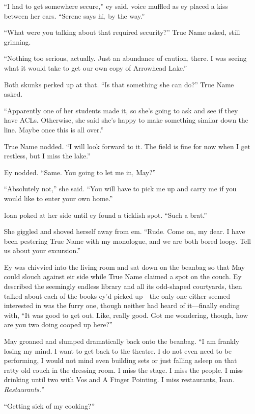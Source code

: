 ``I had to get somewhere secure,'' ey said, voice muffled as ey placed a kiss between her ears. ``Serene says hi, by the way.''

``What were you talking about that required security?'' True Name asked, still grinning.

``Nothing too serious, actually. Just an abundance of caution, there. I was seeing what it would take to get our own copy of Arrowhead Lake.''

Both skunks perked up at that. ``Is that something she can do?'' True Name asked.

``Apparently one of her students made it, so she's going to ask and see if they have ACLs. Otherwise, she said she's happy to make something similar down the line. Maybe once this is all over.''

True Name nodded. ``I will look forward to it. The field is fine for now when I get restless, but I miss the lake.''

Ey nodded. ``Same. You going to let me in, May?''

``Absolutely not,'' she said. ``You will have to pick me up and carry me if you would like to enter your own home.''

Ioan poked at her side until ey found a ticklish spot. ``Such a brat.''

She giggled and shoved herself away from em. ``Rude. Come on, my dear. I have been pestering True Name with my monologue, and we are both bored loopy. Tell us about your excursion.''

Ey was chivvied into the living room and sat down on the beanbag so that May could slouch against eir side while True Name claimed a spot on the couch. Ey described the seemingly endless library and all its odd-shaped courtyards, then talked about each of the books ey'd picked up—the only one either seemed interested in was the furry one, though neither had heard of it—finally ending with, ``It was good to get out. Like, really good. Got me wondering, though, how are you two doing cooped up here?''

May groaned and slumped dramatically back onto the beanbag. ``I am frankly losing my mind. I want to get back to the theatre. I do not even need to be performing, I would not mind even building sets or just falling asleep on that ratty old couch in the dressing room. I miss the stage. I miss the people. I miss drinking until two with Vos and A Finger Pointing. I miss restaurants, Ioan. \emph{Restaurants.}''

``Getting sick of my cooking?''

